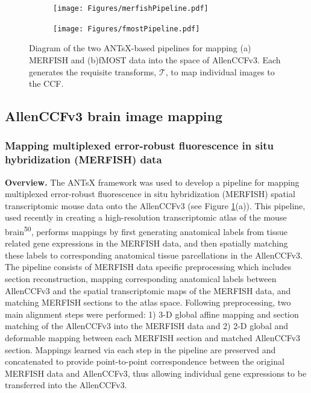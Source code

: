 \documentclass[
  12pt,
]{article}
\begin{document}
\begin{figure}
\centering
\begin{subfigure}[t]{0.49\textwidth}
\centering
\texttt{[image: Figures/merfishPipeline.pdf]}
\caption{}
\end{subfigure} 
\begin{subfigure}[t]{0.49\textwidth}
\centering
\texttt{[image: Figures/fmostPipeline.pdf]}
\caption{}
\end{subfigure}
\caption{Diagram of the two ANTsX-based pipelines for mapping (a) MERFISH
          and (b)fMOST data into the space of AllenCCFv3.  Each generates
         the requisite transforms, $\mathcal{T}$, to map individual images
         to the CCF.}
\label{fig:allenpipelines}
\end{figure}

\subsection{AllenCCFv3 brain image
mapping}\label{allenccfv3-brain-image-mapping}

\subsubsection{Mapping multiplexed error-robust fluorescence in situ
hybridization (MERFISH)
data}\label{mapping-multiplexed-error-robust-fluorescence-in-situ-hybridization-merfish-data}

\textbf{Overview.} The ANTsX framework was used to develop a pipeline
for mapping multiplexed error-robust fluorescence in situ hybridization
(MERFISH) spatial transcriptomic mouse data onto the AllenCCFv3 (see
Figure \ref{fig:allenpipelines}(a)). This pipeline, used recently in
creating a high-resolution transcriptomic atlas of the mouse
brain\textsuperscript{50}, performs mappings by first generating
anatomical labels from tissue related gene expressions in the MERFISH
data, and then spatially matching these labels to corresponding
anatomical tissue parcellations in the AllenCCFv3. The pipeline consists
of MERFISH data specific preprocessing which includes section
reconstruction, mapping corresponding anatomical labels between
AllenCCFv3 and the spatial transcriptomic maps of the MERFISH data, and
matching MERFISH sections to the atlas space. Following preprocessing,
two main alignment steps were performed: 1) 3-D global affine mapping
and section matching of the AllenCCFv3 into the MERFISH data and 2) 2-D
global and deformable mapping between each MERFISH section and matched
AllenCCFv3 section. Mappings learned via each step in the pipeline are
preserved and concatenated to provide point-to-point correspondence
between the original MERFISH data and AllenCCFv3, thus allowing
individual gene expressions to be transferred into the AllenCCFv3.
\end{document}
